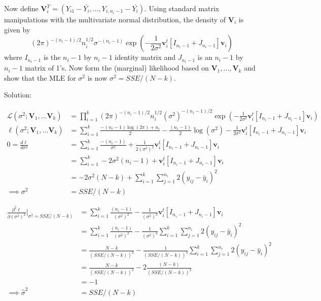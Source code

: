 \documentclass[
  letterpaper,
  DIV=11,
  numbers=noendperiod]{scrreprt}
\begin{document}
Now define
\(\mathbf V_i^T = (Y_{i1} -\bar {Y_i}, \dots, Y_{i,n_i-1}- \bar{Y_i})\).
Using standard matrix manipulations with the multivariate normal
distribution, the density of \(\mathbf V_i\) is given by
\[(2 \pi)^{-(n_i-1)/2}n_i^{1/2}\sigma^{-(n_i-1)} \exp \left(- \frac{1}{2 \sigma ^2} \mathbf v_i^t [I_{n_i-1} + J_{n_i -1}] \mathbf v_i \right) \]
where \(I_{n_i-1}\) is the \(n_i-1\) by \(n_i-1\) identity matrix and
\(J_{n_i-1}\) is an \(n_i-1\) by \(n_i-1\) matrix of 1's. Now form the
(marginal) likelihood based on \(\mathbf V_1, \dots, \mathbf V_k\) and
show that the MLE for \(\sigma^2\) is now \(\sigma^2 = SSE/(N-k)\).

Solution:

\[
\begin{aligned}
\mathcal L (\sigma^2; \mathbf V_1,\dots \mathbf V_k) &= \prod_{i=1}^k(2 \pi)^{-(n_i-1)/2}n_i^{1/2}(\sigma^2)^{-(n_i-1)/2} \exp \left(- \frac{1}{2 \sigma ^2} \mathbf v_i^t [I_{n_i-1} + J_{n_i -1}] \mathbf v_i \right) \\
\ell (\sigma^2; \mathbf V_1,\dots \mathbf V_k) &= \sum_{i=1}^k\frac{-(n_i-1)\log(2 \pi)+n_i}{2}-\frac{(n_i-1)}{2}\log(\sigma^2) - \frac{1}{2 \sigma ^2} \mathbf v_i^t [I_{n_i-1} + J_{n_i -1}] \mathbf v_i \\
0=\frac{d \ell}{d \sigma^2}&=\sum_{i=1}^k \frac{-(n_i-1)}{\sigma^2}+\frac{1}{2 (\sigma^2)^2}  \mathbf v_i^t [I_{n_i-1} + J_{n_i -1}] \mathbf v_i \\
&=\sum_{i=1}^k -2\sigma^2(n_i-1)+ \mathbf v_i^t [I_{n_i-1} + J_{n_i -1}] \mathbf v_i \\
&=-2\sigma^2(N-k)+\sum_{i=1}^k\sum_{j=1}^{n_i} 2(y_{ij} - \bar y_i)^2\\
\implies  \sigma^2 &= SSE/(N-k)
\end{aligned}
\]

\[
\begin{aligned}
\frac{\partial^2 \ell}{\partial (\sigma^2)^2} \bigg|_{\sigma^2 = SSE/(N-k)}&=\sum_{i=1}^k \frac{(n_i-1)}{(\sigma^2)^2}-\frac{1}{(\sigma^2)^3}  \mathbf v_i^t [I_{n_i-1} + J_{n_i -1}] \mathbf v_i \\
&=\sum_{i=1}^k \frac{(n_i-1)}{(\sigma^2)^2}-\frac{1}{(\sigma^2)^3} \sum_{i=1}^k\sum_{j=1}^{n_i} 2(y_{ij} - \bar y_i)^2 \\
&=\frac{N-k}{(SSE/(N-k))^2}-\frac{1}{(SSE/(N-k))^3}\sum_{i=1}^k\sum_{j=1}^{n_i} 2(y_{ij} - \bar y_i)^2\\
&=\frac{N-k}{(SSE/(N-k))^2}-2\frac{(N-k)}{(SSE/(N-k))^2}\\ 
&=-1 \\
\implies  \hat \sigma^2 &= SSE/(N-k)
\end{aligned}
\]
\end{document}
